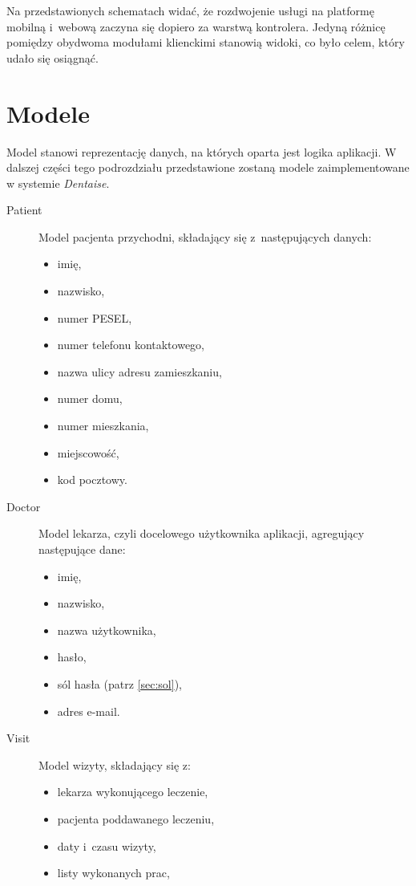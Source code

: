 \documentclass[11pt]{aghdpl}
\begin{document}
Na przedstawionych schematach widać, że rozdwojenie usługi na platformę mobilną i~webową zaczyna się dopiero za warstwą kontrolera. Jedyną różnicę pomiędzy obydwoma modułami klienckimi stanowią widoki, co było celem, który udało się osiągnąć.

\section{Modele}
\label{sec:modele}

Model stanowi reprezentację danych, na których oparta jest logika aplikacji. W dalszej części tego podrozdziału przedstawione zostaną modele zaimplementowane w systemie \emph{Dentaise}.
\begin{description}
\item[Patient]
	Model pacjenta przychodni, składający się z~następujących danych:
	\begin{itemize}
		\item imię,
		\item nazwisko,
		\item numer PESEL,
		\item numer telefonu kontaktowego,
		\item nazwa ulicy adresu zamieszkaniu,
		\item numer domu,
		\item numer mieszkania,
		\item miejscowość,
		\item kod pocztowy.
	\end{itemize}
\item[Doctor]
	Model lekarza, czyli docelowego użytkownika aplikacji, agregujący następujące dane:
	\begin{itemize}
		\item imię,
		\item nazwisko,
		\item nazwa użytkownika,
		\item hasło,
		\item sól hasła (patrz \ref{sec:sol}),
		\item adres e-mail.
	\end{itemize}
\item[Visit]
	Model wizyty, składający się z:
	\begin{itemize}
		\item lekarza wykonującego leczenie,
		\item pacjenta poddawanego leczeniu,
		\item daty i~czasu wizyty,
		\item listy wykonanych prac,

\end{itemize}
\end{description}
\end{document}

